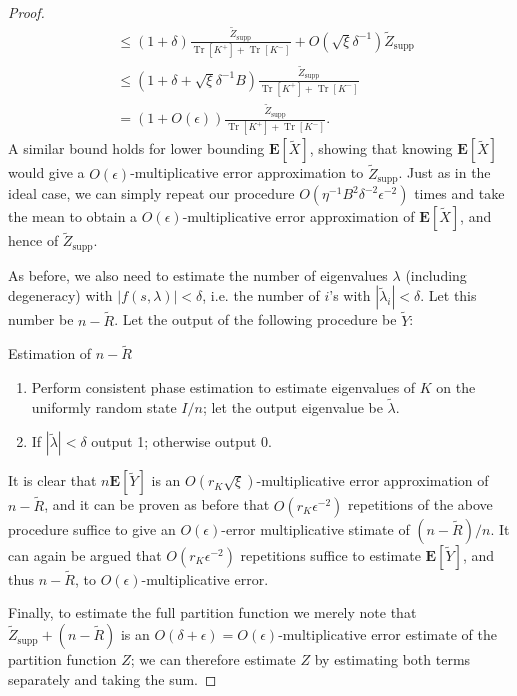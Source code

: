 \documentclass[a4paper,UKenglish,cleveref, autoref]{lipics-v2019}
\theoremstyle{remark}
\numberwithin{equation}{section}
\numberwithin{oracle}{section}
\numberwithin{remark}{section}
\newcommand{\E}{\mathbf{E}}
\DeclareMathOperator{\tr}{Tr}
\begin{document}
\begin{proof}
\begin{align}
&\le (1+\delta) \frac{\widetilde{Z}_{\text{supp}}}{\tr[K^+]+\tr[K^-]} + O(\sqrt{\xi}\delta^{-1})\widetilde{Z}_{\text{supp}} \\
&\le (1 + \delta + \sqrt{\xi}\delta^{-1}B) \frac{\tilde{Z}_{\text{supp}}}{\tr[K^+]+\tr[K^-]} \\
&= (1+O(\epsilon))\frac{\tilde{Z}_{\text{supp}}}{\tr[K^+]+\tr[K^-]}.
\end{align}
A similar bound holds for lower bounding $\E[\widetilde{X}]$, showing that knowing $\E[\widetilde{X}]$ would give a $O(\epsilon)$-multiplicative error approximation to $\widetilde{Z}_{\text{supp}}$. Just as in the ideal case, we can simply repeat our procedure $O(\eta^{-1}B^2\delta^{-2}\epsilon^{-2})$ times and take the mean to obtain a $O(\epsilon)$-multiplicative error approximation of $\E[\widetilde{X}]$, and hence of $\tilde{Z}_{\text{supp}}$.

As before, we also need to estimate the number of eigenvalues $\lambda$ (including degeneracy) with $|f(s,\lambda)| < \delta$, i.e. the number of $i$'s with $|\tilde{\lambda}_i| < \delta$. Let this number be $n - \tilde{R}$. Let the output of the following procedure be $\tilde{Y}$:\\
\begin{algorithm}[H]
\caption{Estimation of $n-\tilde{R}$}
 \label{algo:n-tildeR}
\begin{enumerate}
\item Perform consistent phase estimation to estimate eigenvalues of $K$ on the uniformly random state $I/n$; let the output eigenvalue be $\tilde{\lambda}$.
\item If $|\tilde{\lambda}| < \delta$ output 1; otherwise output 0.
\end{enumerate}
\end{algorithm}
It is clear that $n\E[\tilde{Y}]$ is an $O(r_{K}\sqrt{\xi})$-multiplicative error approximation of $n-\tilde{R}$, and it can be proven as before that  $O(r_{K}\epsilon^{-2})$ repetitions of the above procedure suffice to give an $O(\epsilon)$-error multiplicative stimate of $(n-\tilde{R})/n$. It can again be argued that $O(r_{K}\epsilon^{-2})$ repetitions suffice to estimate $\E[\widetilde{Y}]$, and thus $n-\widetilde{R}$, to $O(\epsilon)$-multiplicative error.

Finally, to estimate the full partition function we merely note that $\widetilde{Z}_{\text{supp}} + (n-\widetilde{R})$ is an $O(\delta+\epsilon) = O(\epsilon)$-multiplicative error estimate of the partition function $Z$; we can therefore estimate $Z$ by estimating both terms separately and taking the sum.
\end{proof}
\end{document}
